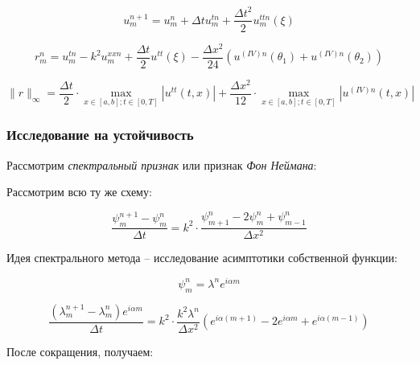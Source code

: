 \documentclass[10pt,a4paper]{article}
\begin{document}
		\begin{equation}
			u^{n + 1}_{m} = u^{n}_{m} + \Delta t u^{tn}_{m} + \frac{\Delta t^{2}}{2}u^{ttn}_{m}\left(\xi\right)
		\end{equation}
		
		\begin{equation}
			r_{m}^{n} = u^{tn}_{m} - k^{2}u^{xxn}_{m} + \frac{\Delta t}{2}
			u^{tt}\left(\xi\right) - \frac{\Delta x^{2}}{24}\left(
			u^{\left(IV\right)n}\left(\theta_{1}\right) + 
			u^{\left(IV\right)n}\left(\theta_{2}\right)\right)
		\end{equation}
		
		\begin{equation}
			\parallel r \parallel_{\infty} = \frac{\Delta t}{2}\cdot 
			\max\limits_{x \in \left[a, b\right]; t \in \left[0, T\right]}
			\left|u^{tt}\left(t, x\right)\right| + 
			\frac{\Delta x^{2}}{12}\cdot
			\max\limits_{x \in \left[a, b\right]; t \in \left[0, T\right]}
			\left|u^{\left(IV\right)n}\left(t, x\right)\right|
		\end{equation}
		
		\subsubsection{Исследование на устойчивость}
		
		Рассмотрим \textit{спектральный признак} или признак \textit{Фон
		Неймана}:
		
		Рассмотрим всю ту же схему:
		
		\begin{equation}
			\frac{\psi^{n + 1}_{m} - \psi^{n}_{m}}{\Delta t} = k^{2}
			\cdot\frac{\psi^{n}_{m + 1} - 2\psi^{n}_{m} + \psi^{n}_{m - 1}}
			{\Delta x^{2}}
		\end{equation}
		
		Идея спектрального метода -- исследование асимптотики собственной 	
		функции:
		
		\begin{equation}
			\psi^{n}_{m} = \lambda^{n}e^{i\alpha m}
		\end{equation}
		
		\begin{equation}
			\frac{\left(\lambda^{n + 1}_{m} - \lambda^{n}_{m}\right)e^{i\alpha 
			m}}{\Delta t} = k^{2}\cdot
			\frac{k^{2}\lambda^{n}}{\Delta x^{2}}\left(e^{i\alpha\left(m + 1\right)} - 2e^{i\alpha m} + e^{i\alpha\left(m - 1\right)}\right)
		\end{equation}
		
		После сокращения, получаем:
		
\end{document}
